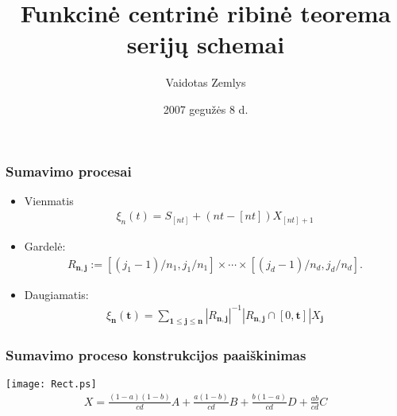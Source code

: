 \documentclass[utf8,hyperref={unicode}]{beamer}
\title[FCRT serijų schemai]{Funkcinė centrinė ribinė teorema serijų schemai}
\author[Zemlys]{Vaidotas Zemlys}
\institute[Vilnius University] {
    
    Vilniaus Universitetas
    \and
    
    Université des Sciences et Technologies de Lille
 }
\date{2007 gegužės 8 d.}
\theoremstyle{change}\newtheorem{teorema}{Teiginys}
\theoremstyle{change}\newtheorem{salyga}{}
\begin{document}
\begin{frame}
    \titlepage
\end{frame}

\begin{frame}
    \frametitle{Sumavimo procesai} 
    \begin{itemize}
	\item Vienmatis
	    \begin{align*}
		\xi_n(t)=S_{[nt]}+(nt-[nt])X_{[nt]+1}
	    \end{align*}
	\item Gardelė:
	     \begin{align*}
	    R_{\bm{n},\bm{j}} := [(j_1-1)/n_1, j_1/n_1]\times\cdots\times
[(j_d-1)/n_d, j_d/n_d].
	    \end{align*}

	\item Daugiamatis:
	    \begin{align*}
		\xi_{\bm{n}}(\bm{t})=\sum_{\bm{1}\le \bm{j}\le
		\bm{n}}|R_{\bm{n},\bm{j}}|^{-1}|R_{\bm{n},\bm{j}}\cap
		[0,\bm{t}]|X_{\bm{j}}	
	    \end{align*}
    \end{itemize}
\end{frame}
\begin{frame}
    \frametitle{Sumavimo proceso konstrukcijos paaiškinimas} 
    \texttt{[image: Rect.ps]}
    \begin{align*}
	X=\frac{(1-a)(1-b)}{cd}A+\frac{a(1-b)}{cd}B+\frac{b(1-a)}{cd}D+
	\frac{ab}{cd}C
    \end{align*}
\end{frame}
\end{document}
